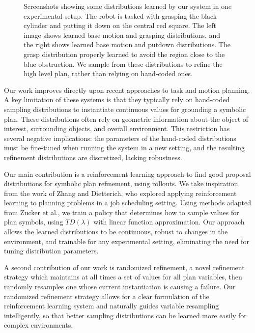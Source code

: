 \begin{figure}[h]
  \caption{Screenshots showing some distributions learned by our system in one experimental
    setup. The robot is tasked with grasping the black cylinder and putting it down on the
    central red square. The left image shows learned base motion and grasping distributions,
    and the right shows learned base motion and putdown distributions. The grasp distribution
    properly learned to avoid the region close to the blue obstruction. We sample from these distributions
    to refine the high level plan, rather than relying on hand-coded ones.}
  \label{fig:cover}
\end{figure}

Our work improves directly upon recent approaches to task and motion planning.
A key limitation of these systems is that they typically rely on hand-coded
sampling distributions to instantiate continuous values for grounding a symbolic plan.
These distributions often rely on
geometric information about the object of interest, surrounding objects, and overall
environment. This restriction has several negative implications: the parameters of the
hand-coded distributions must be fine-tuned when running the system in a new setting, and the
resulting refinement distributions are discretized, lacking robustness.

Our main contribution is a reinforcement learning approach to find good proposal
distributions for symbolic plan refinement, using rollouts. We take inspiration
from the work of Zhang and Dietterich, who explored applying reinforcement learning
to planning problems in a job scheduling setting. Using methods adapted from
Zucker et al., we train a policy that
determines how to sample values for plan symbols, using $TD(\lambda)$ with linear function
approximation. Our approach allows
the learned distributions to be continuous, robust to changes in the environment, and
trainable for any experimental setting, eliminating the need for tuning distribution parameters.

A second contribution of our work is randomized refinement, a novel refinement strategy
which maintains at all times a set of values for all plan variables, then randomly
resamples one whose current instantiation is causing a failure.
Our randomized refinement strategy allows for a clear formulation of the reinforcement
learning system and naturally guides variable resampling intelligently, so that better
sampling distributions can be learned more easily for complex environments.


